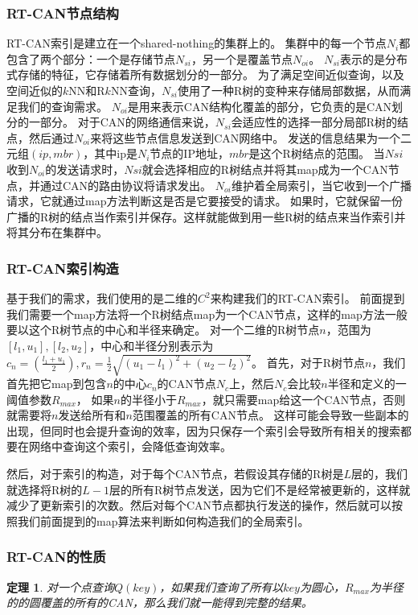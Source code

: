 \documentclass{ML}
\newtheorem{theorem}{\hspace{2em}定理}
\begin{document}
\subsubsection{RT-CAN节点结构}
RT-CAN索引是建立在一个shared-nothing的集群上的。
集群中的每一个节点$N_i$都包含了两个部分：一个是存储节点$N_{si}$，另一个是覆盖节点$N_{oi}$。
$N_{si}$表示的是分布式存储的特征，它存储着所有数据划分的一部分。
为了满足空间近似查询，以及空间近似的$k$NN和R$k$NN查询，$N_{si}$使用了一种R树的变种来存储局部数据，从而满足我们的查询需求。
$N_{oi}$是用来表示CAN结构化覆盖的部分，它负责的是CAN划分的一部分。
对于CAN的网络通信来说，$N_{si}$会适应性的选择一部分局部R树的结点，然后通过$N_{oi}$来将这些节点信息发送到CAN网络中。
发送的信息结果为一个二元组$(ip,mbr)$，其中ip是$N_i$节点的IP地址，$mbr$是这个R树结点的范围。
当$N{si}$收到$N_{oi}$的发送请求时，$N{si}$就会选择相应的R树结点并将其map成为一个CAN节点，并通过CAN的路由协议将请求发出。
$N_{oi}$维护着全局索引，当它收到一个广播请求，它就通过map方法判断这是否是它要接受的请求。
如果时，它就保留一份广播的R树的结点当作索引并保存。这样就能做到用一些R树的结点来当作索引并将其分布在集群中。

\subsubsection{RT-CAN索引构造}
基于我们的需求，我们使用的是二维的$C^2$来构建我们的RT-CAN索引。
前面提到我们需要一个map方法将一个R树结点map为一个CAN节点，这样的map方法一般要以这个R树节点的中心和半径来确定。
对一个二维的R树节点$n$，范围为$[l_1,u_1],[l_2,u_2]$，中心和半径分别表示为$c_n=(\frac{l_1+u_1}{2}),r_n=\frac{1}{2}\sqrt{(u_1-l_1)^2+(u_2-l_2)^2}$。
首先，对于R树节点$n$，我们首先把它map到包含$n$的中心$c_n$的CAN节点$N_c$上，然后$N_c$会比较$n$半径和定义的一阈值参数$R_{max}$，
如果$n$的半径小于$R_{max}$，就只需要map给这一个CAN节点，否则就需要将$n$发送给所有和$n$范围覆盖的所有CAN节点。
这样可能会导致一些副本的出现，但同时也会提升查询的效率，因为只保存一个索引会导致所有相关的搜索都要在网络中查询这个索引，会降低查询效率。

然后，对于索引的构造，对于每个CAN节点，若假设其存储的R树是$L$层的，我们就选择将R树的$L-1$层的所有R树节点发送，因为它们不是经常被更新的，这样就减少了更新索引的次数。然后对每个CAN节点都执行发送的操作，然后就可以按照我们前面提到的map算法来判断如何构造我们的全局索引。

\subsubsection{RT-CAN的性质}
\begin{theorem}\label{theorem:RT-CAN-1}
  对一个点查询$Q(key)$，如果我们查询了所有以$key$为圆心，$R_{max}$为半径的的圆覆盖的所有的CAN，那么我们就一能得到完整的结果。
\end{theorem}
\end{document}
